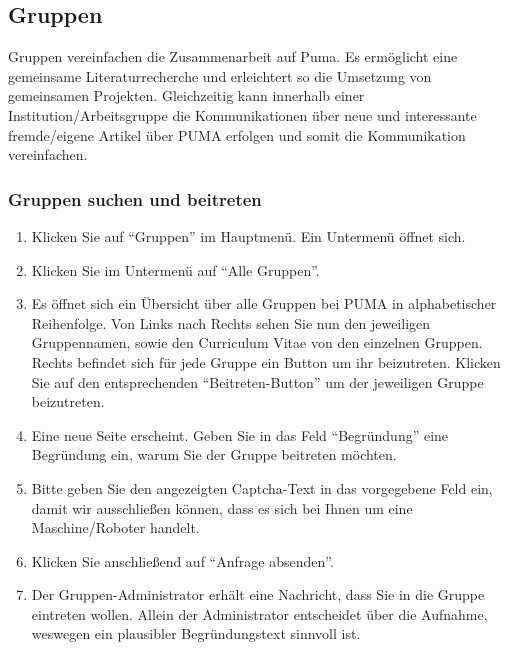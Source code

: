 \documentclass[a4paper,11pt,twoside]{scrbook}
\begin{document}
\subsection{Gruppen}
Gruppen vereinfachen die Zusammenarbeit auf Puma. Es ermöglicht eine gemeinsame Literaturrecherche und erleichtert so die Umsetzung von gemeinsamen Projekten. Gleichzeitig kann innerhalb einer Institution/Arbeitsgruppe die Kommunikationen über neue und interessante fremde/eigene Artikel über PUMA erfolgen und somit die Kommunikation vereinfachen. 
\subsubsection{Gruppen suchen und beitreten}%
\begin{enumerate}
    \item Klicken Sie auf \enquote{Gruppen} im Hauptmenü. Ein Untermenü öffnet sich.
    \item Klicken Sie im Untermenü auf \enquote{Alle Gruppen}.
    \item Es öffnet sich ein Übersicht über alle Gruppen bei PUMA in alphabetischer Reihenfolge. Von Links nach Rechts sehen Sie nun den jeweiligen Gruppennamen, sowie den Curriculum Vitae von den einzelnen Gruppen. Rechts befindet sich für jede Gruppe ein Button um ihr beizutreten. Klicken Sie auf den entsprechenden  \enquote{Beitreten-Button} um der jeweiligen Gruppe beizutreten.
    \item Eine neue Seite erscheint. Geben Sie in das Feld \enquote{Begründung} eine Begründung ein, warum Sie der Gruppe beitreten möchten.
    \item Bitte geben Sie den angezeigten Captcha-Text in das vorgegebene Feld ein, damit wir ausschließen können, dass es sich bei Ihnen um eine Maschine/Roboter handelt.
    \item Klicken Sie anschließend auf \enquote{Anfrage absenden}.
    \item Der Gruppen-Administrator erhält eine Nachricht, dass Sie in die Gruppe eintreten wollen. Allein der Administrator entscheidet über die Aufnahme, weswegen ein plausibler Begründungstext sinnvoll ist.
\end{enumerate}
\end{document}
